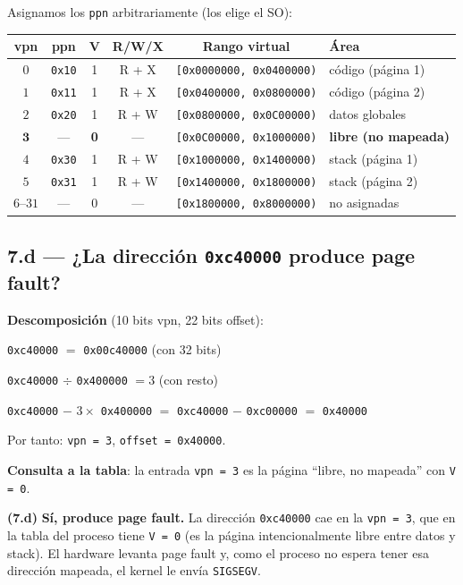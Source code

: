 \documentclass[11pt,a4paper]{article}
\begin{document}
Asignamos los \texttt{ppn} arbitrariamente (los elige el SO):

\begin{center}
\small
\begin{tabular}{@{}cccccp{4.5cm}@{}}
\toprule
vpn        & ppn          & V & R/W/X    & Rango virtual                        & Área \\
\midrule
$0$        & \texttt{0x10} & 1 & R + X    & \texttt{[0x0000000, 0x0400000)}      & código (página 1) \\
$1$        & \texttt{0x11} & 1 & R + X    & \texttt{[0x0400000, 0x0800000)}      & código (página 2) \\
$2$        & \texttt{0x20} & 1 & R + W    & \texttt{[0x0800000, 0x0C00000)}      & datos globales \\
$\boldsymbol{3}$ & ---     & \textbf{0} & --- & \texttt{[0x0C00000, 0x1000000)} & \textbf{libre (no mapeada)} \\
$4$        & \texttt{0x30} & 1 & R + W    & \texttt{[0x1000000, 0x1400000)}      & stack (página 1) \\
$5$        & \texttt{0x31} & 1 & R + W    & \texttt{[0x1400000, 0x1800000)}      & stack (página 2) \\
$6$--$31$  & ---           & 0 & ---      & \texttt{[0x1800000, 0x8000000)}      & no asignadas \\
\bottomrule
\end{tabular}
\end{center}

\subsection*{7.d --- ¿La dirección \texttt{0xc40000} produce page fault?}

\textbf{Descomposición} (10 bits vpn, 22 bits offset):

\quad \texttt{0xc40000} $=$ \texttt{0x00c40000} (con 32 bits)

\quad \texttt{0xc40000} $\div$ \texttt{0x400000} $= 3$ (con resto)

\quad \texttt{0xc40000} $-$ $3 \times$ \texttt{0x400000} $=$ \texttt{0xc40000} $-$ \texttt{0xc00000} $=$ \texttt{0x40000}

Por tanto: \texttt{vpn = 3}, \texttt{offset = 0x40000}.

\textbf{Consulta a la tabla}: la entrada \texttt{vpn = 3} es la página
``libre, no mapeada'' con \texttt{V = 0}.

\begin{respuesta}
\textbf{(7.d)} \textbf{Sí, produce page fault.} La dirección
\texttt{0xc40000} cae en la \texttt{vpn = 3}, que en la tabla del
proceso tiene \texttt{V = 0} (es la página intencionalmente libre
entre datos y stack). El hardware levanta page fault y, como el
proceso no espera tener esa dirección mapeada, el kernel le envía
\texttt{SIGSEGV}.
\end{respuesta}
\end{document}
